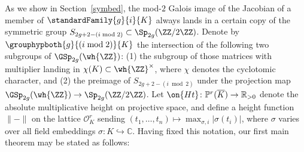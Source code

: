 As we show in Section~\ref{symbed},
the mod-$2$ Galois image of the Jacobian of a member of $\standardFamily{g}{i}{K}$ always lands in a certain copy of the symmetric group $S_{2g+2-(i \bmod 2)} \subset \Sp_{2g}(\ZZ/2\ZZ)$. Denote by $\grouphypboth{g}{(i \bmod 2)}{K}$ the intersection of the following two subgroups of $\GSp_{2g}(\wh{\ZZ})$: (1) the subgroup of those matrices with multiplier landing in $\chi(K) \subset \wh{\ZZ}^\times$, where $\chi$ denotes the cyclotomic character, and (2) the preimage of $S_{2g+2-(i \bmod 2)}$ under the projection map $\GSp_{2g}(\wh{\ZZ}) \to \Sp_{2g}(\ZZ/2\ZZ)$. 
Let $\on{Ht}\colon\mathbb P^r(\overline K) \rightarrow \mathbb R_{>0}$
denote the absolute multiplicative height on projective space, and define a height function $\| - \|$ on the lattice $\mathcal O^r_K$
sending $\left( t_1, \ldots, t_n \right) \mapsto \max_{\sigma,i}|\sigma(t_i)|$,
where $\sigma$ varies over all field embeddings $\sigma\colon K \hookrightarrow \mathbb C$.
Having fixed this notation, our first main theorem may be stated as follows:

